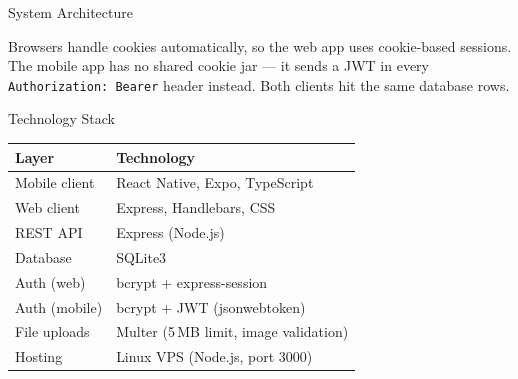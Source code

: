 \documentclass[final]{beamer}
\newlength{\colwidth}
\begin{document}
\begin{frame}[t,fragile]
\begin{columns}[t]
\begin{column}{\colwidth}
\begin{block}{System Architecture}
\begin{center}
    \end{center}

    \vspace{0.1cm}
    Browsers handle cookies automatically, so the web app uses cookie-based
    sessions. The mobile app has no shared cookie jar --- it sends a JWT in
    every \texttt{Authorization: Bearer} header instead. Both clients hit the
    same database rows.
  \end{block}

  \begin{block}{Technology Stack}
    \begin{center}
    \begin{tabular}{ll}
    \toprule
    \textbf{Layer} & \textbf{Technology} \\
    \midrule
    Mobile client   & React Native, Expo, TypeScript \\
    Web client      & Express, Handlebars, CSS \\
    REST API        & Express (Node.js) \\
    Database        & SQLite3 \\
    Auth (web)      & bcrypt + express-session \\
    Auth (mobile)   & bcrypt + JWT (jsonwebtoken) \\
    File uploads    & Multer (5\,MB limit, image validation) \\
    Hosting         & Linux VPS (Node.js, port 3000) \\
    \bottomrule
    \end{tabular}
    \end{center}
  \end{block}


\end{column}
\end{columns}
\end{frame}
\end{document}
